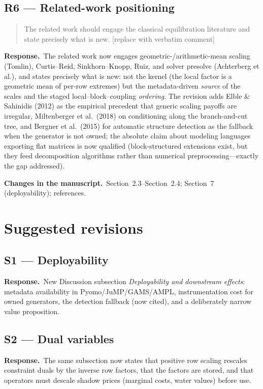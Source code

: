 \documentclass[11pt]{article}
\newenvironment{reviewerquote}%
  {\medskip\noindent\color{quotegray}\itshape\begin{quotation}\noindent}%
  {\end{quotation}\medskip}
\newcommand{\resp}{\noindent\textbf{Response.}\ }
\newcommand{\changes}{\par\smallskip\noindent\textbf{Changes in the manuscript.}\ }
\newcommand{\secref}[1]{Section~#1}
\begin{document}
\subsection*{R6 --- Related-work positioning}
\begin{reviewerquote}
The related work should engage the classical equilibration literature and state precisely
what is new. [replace with verbatim comment]
\end{reviewerquote}
\resp The related work now engages geometric-/arithmetic-mean scaling (Tomlin),
Curtis--Reid, Sinkhorn--Knopp, Ruiz, and solver presolve (Achterberg et al.), and states
precisely what is new: not the kernel (the local factor is a geometric mean of per-row
extremes) but the metadata-driven \emph{source} of the scales and the staged
local--block--coupling \emph{ordering}. The revision adds Elble \& Sahinidis (2012) as
the empirical precedent that generic scaling payoffs are irregular, Miltenberger et al.\
(2018) on conditioning along the branch-and-cut tree, and Bergner et al.\ (2015) for
automatic structure detection as the fallback when the generator is not owned; the
absolute claim about modeling languages exporting flat matrices is now qualified
(block-structured extensions exist, but they feed decomposition algorithms rather than
numerical preprocessing---exactly the gap addressed).
\changes \secref{2.3}--\secref{2.4}; \secref{7} (deployability); references.

\section*{Suggested revisions}

\subsection*{S1 --- Deployability}
\resp New Discussion subsection \emph{Deployability and downstream effects}: metadata
availability in Pyomo/JuMP/GAMS/AMPL, instrumentation cost for owned generators, the
detection fallback (now cited), and a deliberately narrow value proposition.

\subsection*{S2 --- Dual variables}
\resp The same subsection now states that positive row scaling rescales constraint duals
by the inverse row factors, that the factors are stored, and that operators must descale
shadow prices (marginal costs, water values) before use.
\end{document}

